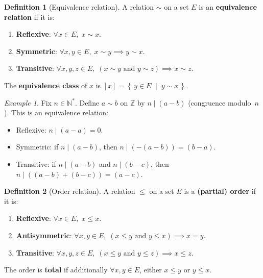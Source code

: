 \documentclass[12pt,a4paper,openany]{book}
\newcommand{\N}{\mathbb{N}}
\newcommand{\Z}{\mathbb{Z}}
\newcommand{\setcond}[2]{\left\{\,#1\;\middle|\;#2\,\right\}}
\theoremstyle{definition}
\newtheorem{definition}{Definition}[chapter]
\theoremstyle{remark}
\newtheorem{example}{Example}[chapter]
\begin{document}
\begin{definition}[Equivalence relation]\label{def:equiv-rel}
A relation $\sim$ on a set $E$ is an \textbf{equivalence relation} if it is:
\begin{enumerate}[label=(\roman*)]
  \item \textbf{Reflexive}: $\forall x \in E,\; x \sim x$.
  \item \textbf{Symmetric}: $\forall x,y \in E,\;
    x \sim y \implies y \sim x$.
  \item \textbf{Transitive}: $\forall x,y,z \in E,\;
    (x \sim y \text{ and } y \sim z) \implies x \sim z$.
\end{enumerate}
The \textbf{equivalence class} of $x$ is
$[x] = \setcond{y \in E}{y \sim x}$.
\end{definition}

\begin{example}\label{ex:congruence}
Fix $n \in \N^*$.  Define $a \sim b$ on $\Z$ by $n \mid (a-b)$ (congruence
modulo~$n$).  This is an equivalence relation:
\begin{itemize}
  \item Reflexive: $n \mid (a-a) = 0$.
  \item Symmetric: if $n \mid (a-b)$, then $n \mid (-(a-b)) = (b-a)$.
  \item Transitive: if $n \mid (a-b)$ and $n \mid (b-c)$, then
    $n \mid ((a-b)+(b-c)) = (a-c)$.
\end{itemize}
\end{example}

\begin{definition}[Order relation]\label{def:order-rel}
A relation $\leq$ on a set $E$ is a \textbf{(partial) order} if it is:
\begin{enumerate}[label=(\roman*)]
  \item \textbf{Reflexive}: $\forall x \in E,\; x \leq x$.
  \item \textbf{Antisymmetric}: $\forall x,y \in E,\;
    (x \leq y \text{ and } y \leq x) \implies x = y$.
  \item \textbf{Transitive}: $\forall x,y,z \in E,\;
    (x \leq y \text{ and } y \leq z) \implies x \leq z$.
\end{enumerate}
The order is \textbf{total} if additionally $\forall
x,y \in E$, either $x \leq y$ or $y \leq x$.
\end{definition}
\end{document}

